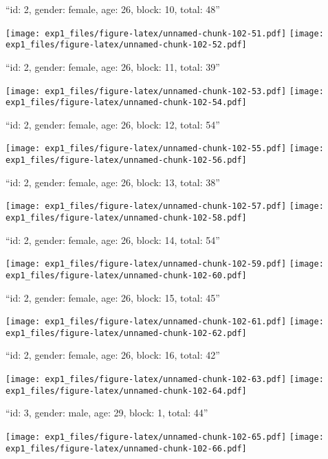 \documentclass[11pt,,]{article}
\begin{document}
\newpage
[1] 

``id: 2, gender: female, age: 26, block: 10, total: 48''

\texttt{[image: exp1\_files/figure-latex/unnamed-chunk-102-51.pdf]}
\texttt{[image: exp1\_files/figure-latex/unnamed-chunk-102-52.pdf]}

\newpage
[1] 

``id: 2, gender: female, age: 26, block: 11, total: 39''

\texttt{[image: exp1\_files/figure-latex/unnamed-chunk-102-53.pdf]}
\texttt{[image: exp1\_files/figure-latex/unnamed-chunk-102-54.pdf]}

\newpage
[1] 

``id: 2, gender: female, age: 26, block: 12, total: 54''

\texttt{[image: exp1\_files/figure-latex/unnamed-chunk-102-55.pdf]}
\texttt{[image: exp1\_files/figure-latex/unnamed-chunk-102-56.pdf]}

\newpage
[1] 

``id: 2, gender: female, age: 26, block: 13, total: 38''

\texttt{[image: exp1\_files/figure-latex/unnamed-chunk-102-57.pdf]}
\texttt{[image: exp1\_files/figure-latex/unnamed-chunk-102-58.pdf]}

\newpage
[1] 

``id: 2, gender: female, age: 26, block: 14, total: 54''

\texttt{[image: exp1\_files/figure-latex/unnamed-chunk-102-59.pdf]}
\texttt{[image: exp1\_files/figure-latex/unnamed-chunk-102-60.pdf]}

\newpage
[1] 

``id: 2, gender: female, age: 26, block: 15, total: 45''

\texttt{[image: exp1\_files/figure-latex/unnamed-chunk-102-61.pdf]}
\texttt{[image: exp1\_files/figure-latex/unnamed-chunk-102-62.pdf]}

\newpage
[1] 

``id: 2, gender: female, age: 26, block: 16, total: 42''

\texttt{[image: exp1\_files/figure-latex/unnamed-chunk-102-63.pdf]}
\texttt{[image: exp1\_files/figure-latex/unnamed-chunk-102-64.pdf]}

\newpage
[1] 

``id: 3, gender: male, age: 29, block: 1, total: 44''

\texttt{[image: exp1\_files/figure-latex/unnamed-chunk-102-65.pdf]}
\texttt{[image: exp1\_files/figure-latex/unnamed-chunk-102-66.pdf]}
\end{document}
